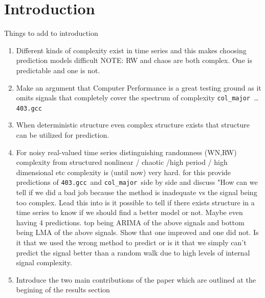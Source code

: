\documentclass{article}
\newcommand{\gcc}{{\tt 403.gcc}~}
\newcommand{\col}{{\tt col\_major}~}
\begin{document}
\section{Introduction}\label{sec:intro}
Things to add to introduction
\begin{enumerate}
\item Different kinds of complexity exist in time series and this makes choosing prediction models difficult 
\subitem NOTE: RW and chaos are both complex. One is predictable and one is not.

\item Make an argument that Computer Performance is a great testing ground as it omits signals that completely cover the spectrum of complexity \col \dots \gcc

\item When deterministic structure even complex structure exists that structure can be utilized for prediction. 
\item For noisy real-valued time series distinguishing randomness (WN,RW) complexity from structured nonlinear / chaotic /high period / high dimensional etc complexity is (until now) very hard. 
\subitem for this provide predictions of \gcc and \col side by side and discuss "How can we tell if we did a bad job because the method is inadequate vs the signal being too complex. Lead this into is it possible to tell if there exists structure in a time series to know if we should find a better model or not. Maybe even having 4 predictions. top being ARIMA of the above signals and bottom being LMA of the above signals. Show that one improved and one did not. Is it that we used the wrong method to predict or is it that we simply can't predict the signal better than a random walk due to high levels of internal signal complexity.



\item Introduce the two main contributions of the paper which are outlined at the begining of the results section

\end{enumerate}
\end{document}
